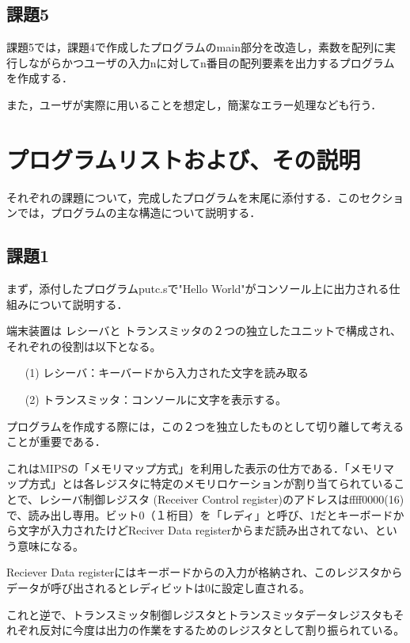 \documentclass[a4j]{jarticle}
\begin{document}
\subsection{課題5}

課題5では，課題4で作成したプログラムのmain部分を改造し，素数を配列に実行しながらかつユーザの入力nに対してn番目の配列要素を出力するプログラムを作成する．

また，ユーザが実際に用いることを想定し，簡潔なエラー処理なども行う．




%
%

\section{プログラムリストおよび、その説明}

それぞれの課題について，完成したプログラムを末尾に添付する．このセクションでは，プログラムの主な構造について説明する．

\subsection{課題1}

まず，添付したプログラムputc.sで"Hello World"がコンソール上に出力される仕組みについて説明する．

端末装置は レシーバと トランスミッタの２つの独立したユニットで構成され、それぞれの役割は以下となる。

\begin{itemize}
\item[(1)]レシーバ：キーバードから入力された文字を読み取る
\item[(2)]トランスミッタ：コンソールに文字を表示する。
\end{itemize}

プログラムを作成する際には，この２つを独立したものとして切り離して考えることが重要である．

これはMIPSの「メモリマップ方式」を利用した表示の仕方である．「メモリマップ方式」とは各レジスタに特定のメモリロケーションが割り当てられていることで、レシーバ制御レジスタ (Receiver Control register)のアドレスはffff0000(16)で、読み出し専用。ビット0（１桁目）を「レディ」と呼び、1だとキーボードから文字が入力されたけどReciver Data registerからまだ読み出されてない、という意味になる。

Reciever Data registerにはキーボードからの入力が格納され、このレジスタからデータが呼び出されるとレディビットは0に設定し直される。

これと逆で、トランスミッタ制御レジスタとトランスミッタデータレジスタもそれぞれ反対に今度は出力の作業をするためのレジスタとして割り振られている。
\end{document}
